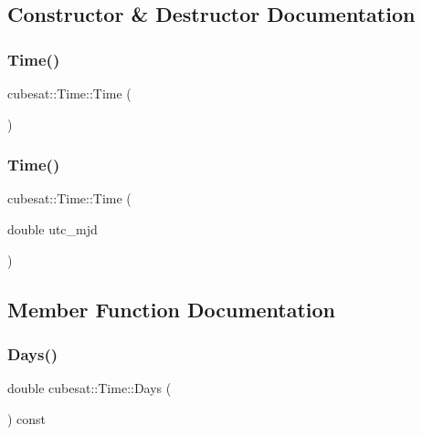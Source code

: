 \subsection{Constructor \& Destructor Documentation}
\mbox{\label{classcubesat_1_1Time_ab355ab7ba4f12dce3e737447dbc1ffba}} 
\subsubsection{\texorpdfstring{Time()}{Time()}\hspace{0.1cm}{\footnotesize\ttfamily [1/2]}}
{\footnotesize\ttfamily cubesat\+::\+Time\+::\+Time (\begin{DoxyParamCaption}{ }\end{DoxyParamCaption})\hspace{0.3cm}{\ttfamily [inline]}}

\mbox{\label{classcubesat_1_1Time_a1a0e41b512545ca8cbbfcb260efd692c}} 
\subsubsection{\texorpdfstring{Time()}{Time()}\hspace{0.1cm}{\footnotesize\ttfamily [2/2]}}
{\footnotesize\ttfamily cubesat\+::\+Time\+::\+Time (\begin{DoxyParamCaption}\item[{double}]{utc\+\_\+mjd }\end{DoxyParamCaption})\hspace{0.3cm}{\ttfamily [inline]}}



\subsection{Member Function Documentation}
\mbox{\label{classcubesat_1_1Time_a7e144b7b0faa263d897f9626344630b7}} 
\subsubsection{\texorpdfstring{Days()}{Days()}}
{\footnotesize\ttfamily double cubesat\+::\+Time\+::\+Days (\begin{DoxyParamCaption}{ }\end{DoxyParamCaption}) const\hspace{0.3cm}{\ttfamily [inline]}}



